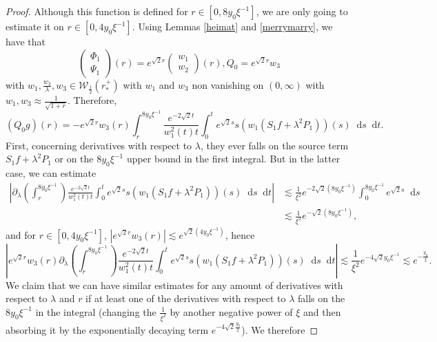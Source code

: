 \documentclass[11 pt]{amsart}
\theoremstyle{definition}
\theoremstyle{remark}
\numberwithin{equation}{section}
\newcommand{\dd}{\mathop{}\!\mathrm{d}}
\begin{document}
\begin{proof}
  Although this function is defined for $r \in [0, 8 y_0 \xi^{- 1}]$, we are only
  going to estimate it on $r \in [0, 4 y_0 \xi^{- 1}]$. Using Lemmas \ref{heimat}
  and \ref{merrymarry}, we have that
  \[ \left(\begin{array}{c}
       \Phi_1\\
       \Psi_1
     \end{array}\right) (r) = e^{\sqrt{2} r} \left(\begin{array}{c}
       w_1\\
       w_2
     \end{array}\right) (r), Q_0 = e^{\sqrt{2} r} w_3 \]
  with $w_1, \frac{w_2}{\lambda}, w_3 \in \mathcal{W}_{\frac{1}{2}} (r_\ast^+)$ with $w_1$ and $w_3$ non vanishing on $(0,\infty)$ with $w_1,w_3\approx \frac{1}{\sqrt{1+r}}$. Therefore,
  \[ (Q_0 g) (r) = - e^{\sqrt{2} r} w_3 (r) \int_r^{8 y_0 \xi^{- 1}} \frac{e^{- 2
     \sqrt{2} t}}{w_1^2 (t) t} \int_0^t e^{\sqrt{2} s} s (w_1 (S_1 f +
     \lambda^2 P_1)) (s) \dd s \dd t. \]
  First, concerning derivatives with respect to $\lambda$, they ever falls on
  the source term $S_1 f + \lambda^2 P_1$ or on the $8 y_0 \xi^{- 1}$ upper bound in the first
  integral. But in the latter case, we can estimate
\begin{align}
\nonumber \left| \partial_{\lambda} \left( \int_r^{8 y_0 \xi^{- 1}} \right)
    \frac{e^{- 2 \sqrt{2} t}}{w_1^2 (t) t} \int_0^t e^{\sqrt{2} s} s (w_1 (S_1
    f + \lambda^2 P_1)) (s) \dd s \dd t \right| & \lesssim  \frac{1}{\xi^2} e^{- 2 \sqrt{2} (8 y_0 \xi^{- 1})} \int_0^{8 y_0
    \xi^{- 1}} e^{\sqrt{2} s}\dd s\\
\label{bd:estimate-bounded-solution-boundary-term}    & \lesssim  \frac{1}{\xi^2} e^{- \sqrt{2} (8 y_0 \xi^{- 1})},
  \end{align}
  and for $r \in [0, 4 y_0 \xi^{- 1}]$, $\left| e^{\sqrt{2} r} w_3 (r) \right|
  \lesssim e^{\sqrt{2} (4 y_0 \xi^{- 1})}$, hence
  \[ \left| e^{\sqrt{2} r} w_3 (r) \partial_{\lambda} \left( \int_r^{8 y_0 \xi^{-
     1}} \right) \frac{e^{- 2 \sqrt{2} t}}{w_1^2 (t) t} \int_0^t e^{\sqrt{2}
     s} s (w_1 (S_1 f + \lambda^2 P_1)) (s) \dd s \dd t \right| \lesssim
     \frac{1}{\xi^2} e^{- 4\sqrt{2} y_0\xi^{- 1}} \lesssim e^{-\frac{y_0}{\xi}}. \]
  We claim that we can have similar estimates for any amount of derivatives
  with respect to $\lambda$ and $r$ if at least one of the derivatives with
  respect to $\lambda$ falls on the $8 y_0 \xi^{- 1}$ in the integral (changing
  the $\frac{1}{\xi^2}$ by another negative power of $\xi$ and then absorbing it by the exponentially decaying term $e^{-4\sqrt{2} \frac{y_0}{\xi}}$). We therefore

\end{proof}
\end{document}

